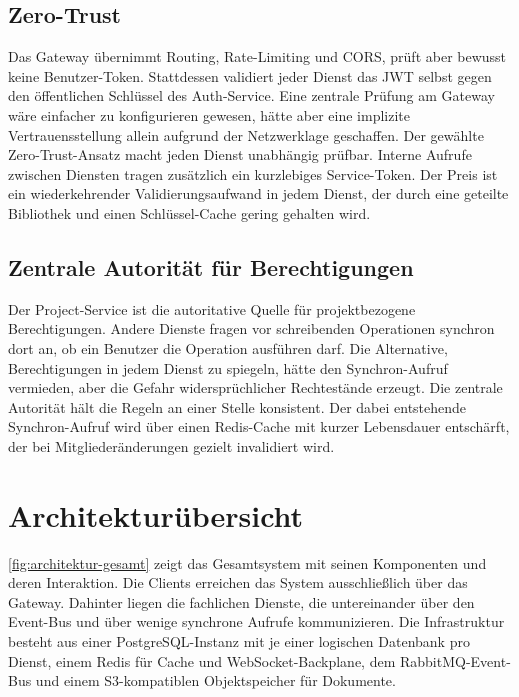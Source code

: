 \subsection{Zero-Trust}

Das Gateway übernimmt Routing, Rate-Limiting und CORS, prüft aber bewusst keine Benutzer-Token. Stattdessen validiert jeder Dienst das JWT selbst gegen den öffentlichen Schlüssel des Auth-Service. Eine zentrale Prüfung am Gateway wäre einfacher zu konfigurieren gewesen, hätte aber eine implizite Vertrauensstellung allein aufgrund der Netzwerklage geschaffen. Der gewählte Zero-Trust-Ansatz \cite{nist2020zerotrust} macht jeden Dienst unabhängig prüfbar. Interne Aufrufe zwischen Diensten tragen zusätzlich ein kurzlebiges Service-Token. Der Preis ist ein wiederkehrender Validierungsaufwand in jedem Dienst, der durch eine geteilte Bibliothek und einen Schlüssel-Cache gering gehalten wird.

\subsection{Zentrale Autorität für Berechtigungen}

Der Project-Service ist die autoritative Quelle für projektbezogene Berechtigungen. Andere Dienste fragen vor schreibenden Operationen synchron dort an, ob ein Benutzer die Operation ausführen darf. Die Alternative, Berechtigungen in jedem Dienst zu spiegeln, hätte den Synchron-Aufruf vermieden, aber die Gefahr widersprüchlicher Rechtestände erzeugt. Die zentrale Autorität hält die Regeln an einer Stelle konsistent. Der dabei entstehende Synchron-Aufruf wird über einen Redis-Cache mit kurzer Lebensdauer entschärft, der bei Mitgliederänderungen gezielt invalidiert wird.


\section{Architekturübersicht}
\label{sec:architekturbild}

\vref{fig:architektur-gesamt} zeigt das Gesamtsystem mit seinen Komponenten und deren Interaktion. Die Clients erreichen das System ausschließlich über das Gateway. Dahinter liegen die fachlichen Dienste, die untereinander über den Event-Bus und über wenige synchrone Aufrufe kommunizieren. Die Infrastruktur besteht aus einer PostgreSQL-Instanz mit je einer logischen Datenbank pro Dienst, einem Redis für Cache und WebSocket-Backplane, dem RabbitMQ-Event-Bus und einem S3-kompatiblen Objektspeicher für Dokumente.

